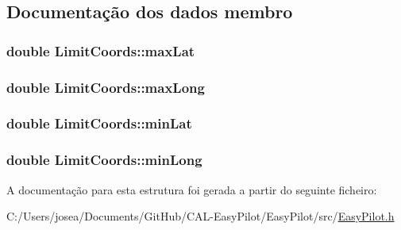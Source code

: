 \subsection{Documentação dos dados membro}
\hypertarget{struct_limit_coords_a9a0fcf9e011923cb568a1c584a51f654}{}
\subsubsection[{max\+Lat}]{\setlength{\rightskip}{0pt plus 5cm}double Limit\+Coords\+::max\+Lat}\label{struct_limit_coords_a9a0fcf9e011923cb568a1c584a51f654}
\hypertarget{struct_limit_coords_aeaddaee7845266a6f234ffd50f748ae4}{}
\subsubsection[{max\+Long}]{\setlength{\rightskip}{0pt plus 5cm}double Limit\+Coords\+::max\+Long}\label{struct_limit_coords_aeaddaee7845266a6f234ffd50f748ae4}
\hypertarget{struct_limit_coords_a1a647ec24500cd353ef30d0de159f0be}{}
\subsubsection[{min\+Lat}]{\setlength{\rightskip}{0pt plus 5cm}double Limit\+Coords\+::min\+Lat}\label{struct_limit_coords_a1a647ec24500cd353ef30d0de159f0be}
\hypertarget{struct_limit_coords_a3ef4041cf2ffec8011de8ff137180895}{}
\subsubsection[{min\+Long}]{\setlength{\rightskip}{0pt plus 5cm}double Limit\+Coords\+::min\+Long}\label{struct_limit_coords_a3ef4041cf2ffec8011de8ff137180895}


A documentação para esta estrutura foi gerada a partir do seguinte ficheiro\+:\begin{DoxyCompactItemize}
\item 
C\+:/\+Users/josea/\+Documents/\+Git\+Hub/\+C\+A\+L-\/\+Easy\+Pilot/\+Easy\+Pilot/src/\hyperlink{_easy_pilot_8h}{Easy\+Pilot.\+h}\end{DoxyCompactItemize}
